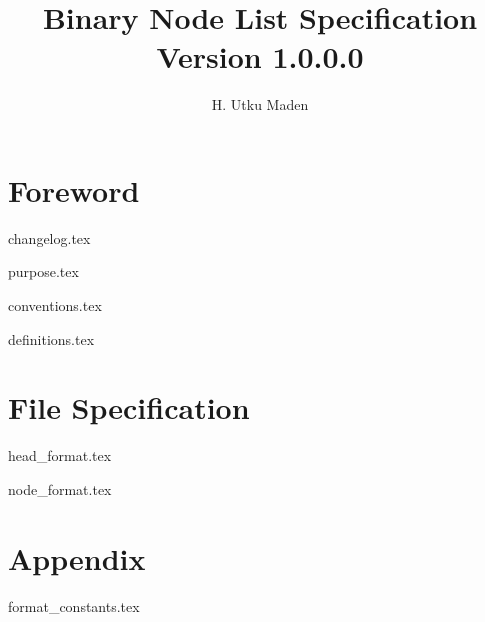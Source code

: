 \documentclass[a4paper, 12pt]{report}
\title{
Binary Node List Specification
{\small\\
	Version 1.0.0.0
}
}
\author {H. Utku Maden}
\begin{document}
\maketitle

\chapter{Foreword}

 {changelog.tex}

 {purpose.tex}

 {conventions.tex}

 {definitions.tex}

\chapter {File Specification}

 {head_format.tex}

 {node_format.tex}

\chapter{Appendix}

 {format_constants.tex}
\end{document}

